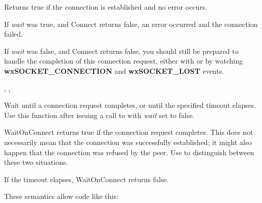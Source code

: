 



Returns true if the connection is established and no error occurs.

If {\it wait} was true, and Connect returns false, an error occurred
and the connection failed.

If {\it wait} was false, and Connect returns false, you should still
be prepared to handle the completion of this connection request, either
with  or by
watching {\bf wxSOCKET\_CONNECTION} and {\bf wxSOCKET\_LOST} events.


, 
, 

%
%
\label{wxsocketclientwaitonconnect}


Wait until a connection request completes, or until the specified timeout
elapses. Use this function after issuing a call
to  with {\it wait} set to false.





WaitOnConnect returns true if the connection request completes. This
does not necessarily mean that the connection was successfully established;
it might also happen that the connection was refused by the peer. Use 
 to distinguish between
these two situations.

If the timeout elapses, WaitOnConnect returns false.

These semantics allow code like this:

